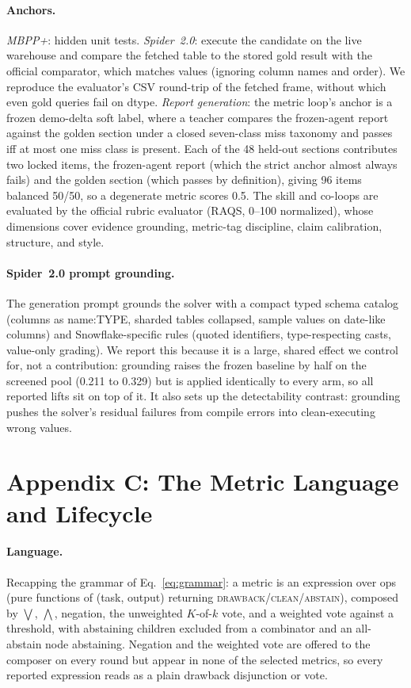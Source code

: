 \documentclass[letterpaper]{article} %
\begin{document}
\paragraph{Anchors.}
\emph{MBPP+}: hidden unit tests. \emph{Spider~2.0}: execute the candidate on the live warehouse and compare the fetched table to the stored gold result with the official comparator, which matches values (ignoring column names and order). We reproduce the evaluator's CSV round-trip of the fetched frame, without which even gold queries fail on dtype. \emph{Report generation}: the metric loop's anchor is a frozen demo-delta soft label, where a teacher compares the frozen-agent report against the golden section under a closed seven-class miss taxonomy and passes iff at most one miss class is present. Each of the 48 held-out sections contributes two locked items, the frozen-agent report (which the strict anchor almost always fails) and the golden section (which passes by definition), giving 96 items balanced 50/50, so a degenerate metric scores 0.5. The skill and co-loops are evaluated by the official rubric evaluator (RAQS, 0--100 normalized), whose dimensions cover evidence grounding, metric-tag discipline, claim calibration, structure, and style.

\paragraph{Spider~2.0 prompt grounding.}
The generation prompt grounds the solver with a compact typed schema catalog (columns as name:TYPE, sharded tables collapsed, sample values on date-like columns) and Snowflake-specific rules (quoted identifiers, type-respecting casts, value-only grading). We report this because it is a large, shared effect we control for, not a contribution: grounding raises the frozen baseline by half on the screened pool (0.211 to 0.329) but is applied identically to every arm, so all reported lifts sit on top of it. It also sets up the detectability contrast: grounding pushes the solver's residual failures from compile errors into clean-executing wrong values.

\section{Appendix C: The Metric Language and Lifecycle}
\label{app:lang}

\paragraph{Language.} Recapping the grammar of Eq.~\ref{eq:grammar}: a metric is an expression over ops (pure functions of (task, output) returning \textsc{drawback}/\textsc{clean}/\textsc{abstain}), composed by $\bigvee$, $\bigwedge$, negation, the unweighted $K$-of-$k$ vote, and a weighted vote against a threshold, with abstaining children excluded from a combinator and an all-abstain node abstaining. Negation and the weighted vote are offered to the composer on every round but appear in none of the selected metrics, so every reported expression reads as a plain drawback disjunction or vote.
\end{document}
